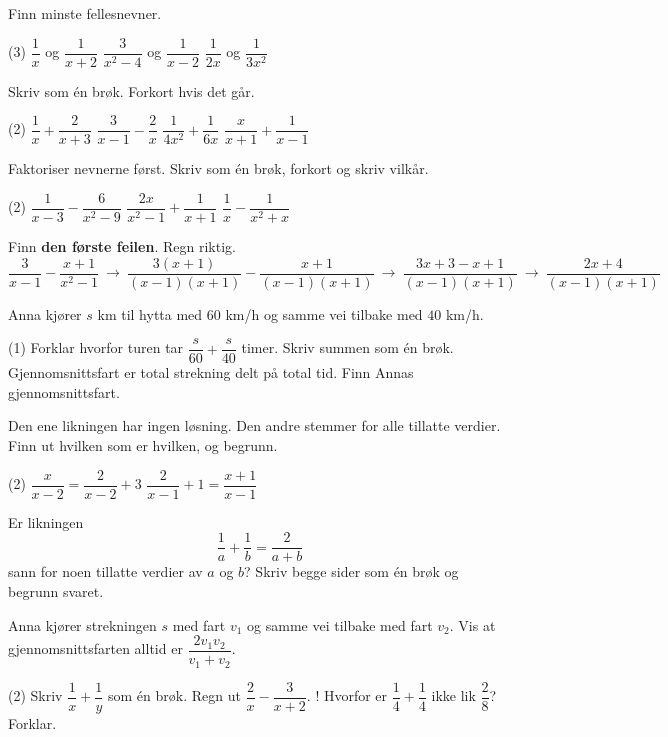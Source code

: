 Finn minste fellesnevner.
\begin{tasks}(3)
  \task $\dfrac{1}{x}$ og $\dfrac{1}{x+2}$
  \task $\dfrac{3}{x^2-4}$ og $\dfrac{1}{x-2}$
  \task $\dfrac{1}{2x}$ og $\dfrac{1}{3x^2}$
\end{tasks}


Skriv som én brøk. Forkort hvis det går.
\begin{tasks}(2)
  \task $\dfrac{1}{x}+\dfrac{2}{x+3}$
  \task $\dfrac{3}{x-1}-\dfrac{2}{x}$
  \task $\dfrac{1}{4x^2}+\dfrac{1}{6x}$
  \task $\dfrac{x}{x+1}+\dfrac{1}{x-1}$
\end{tasks}

Faktoriser nevnerne først. Skriv som én brøk, forkort og skriv vilkår.
\begin{tasks}(2)
  \task $\dfrac{1}{x-3}-\dfrac{6}{x^2-9}$
  \task $\dfrac{2x}{x^2-1}+\dfrac{1}{x+1}$
  \task $\dfrac{1}{x}-\dfrac{1}{x^2+x}$
\end{tasks}

Finn \textbf{den første feilen}. Regn riktig.
\[ \frac{3}{x-1}-\frac{x+1}{x^2-1} \ \longrightarrow\ \frac{3(x+1)}{(x-1)(x+1)}-\frac{x+1}{(x-1)(x+1)} \ \longrightarrow\ \frac{3x+3-x+1}{(x-1)(x+1)} \ \longrightarrow\ \frac{2x+4}{(x-1)(x+1)} \]

Anna kjører $s$ km til hytta med $60$ km/h og samme vei tilbake med $40$ km/h.
\begin{tasks}(1)
  \task Forklar hvorfor turen tar $\dfrac{s}{60}+\dfrac{s}{40}$ timer. Skriv summen som én brøk.
  \task Gjennomsnittsfart er total strekning delt på total tid. Finn Annas gjennomsnittsfart.
\end{tasks}


Den ene likningen har ingen løsning. Den andre stemmer for alle tillatte verdier.
Finn ut hvilken som er hvilken, og begrunn.
\begin{tasks}(2)
  \task $\dfrac{x}{x-2} = \dfrac{2}{x-2}+3$
  \task $\dfrac{2}{x-1}+1 = \dfrac{x+1}{x-1}$
\end{tasks}

Er likningen
\[ \frac{1}{a}+\frac{1}{b} = \frac{2}{a+b} \]
sann for noen tillatte verdier av $a$ og $b$? Skriv begge sider som én brøk og begrunn svaret.

Anna kjører strekningen $s$ med fart $v_1$ og samme vei tilbake med fart $v_2$.
Vis at gjennomsnittsfarten alltid er $\dfrac{2v_1v_2}{v_1+v_2}$.

\begin{sjekk}
\begin{tasks}(2)
  \task Skriv $\dfrac{1}{x}+\dfrac{1}{y}$ som én brøk.
  \task Regn ut $\dfrac{2}{x}-\dfrac{3}{x+2}$.
  \task! Hvorfor er $\dfrac{1}{4}+\dfrac{1}{4}$ ikke lik $\dfrac{2}{8}$? Forklar.
\end{tasks}
\end{sjekk}
